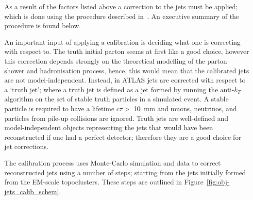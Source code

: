 As a result of the factors listed above a correction to the jets must be applied;
which is done using the procedure described in~\cite{obj-jets_calib_run2}.
An executive summary of the procedure is found below.

An important input of applying a calibration is deciding what one is correcting with respect to.
The truth initial parton seems at first like a good choice,
however this correction depends strongly on the theoretical modelling of the parton shower and hadronisation process,
hence, this would mean that the calibrated jets are not model-independent.
Instead, in ATLAS jets are corrected with respect to a `truth jet';
where a truth jet is defined as a jet formed by running the anti-$k_T$ algorithm on the set of stable truth particles in a simulated event.
A stable particle is required to have a lifetime $c\tau >$ \SI{10}{\milli\metre} and muons, neutrinos, and particles from pile-up collisions are ignored.
Truth jets are well-defined and model-independent objects representing the jets that would have been reconstructed if one had a perfect detector;
therefore they are a good choice for jet corrections.

The calibration process uses Monte-Carlo simulation and data to correct reconstructed jets using a number of steps;
starting from the jets initially formed from the EM-scale topoclusters.
These steps are outlined in Figure~\ref{fig:obj-jets_calib_schem}.


